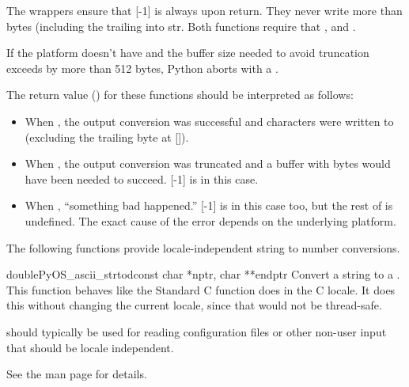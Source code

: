 The wrappers ensure that [-1] is always
 upon return. They never write more than
 bytes (including the trailing 
into str. Both functions require that ,
 and .

If the platform doesn't have  and the buffer
size needed to avoid truncation exceeds  by more than 512
bytes, Python aborts with a .

The return value () for these functions should be interpreted
as follows:

\begin{itemize}

\item When , the output conversion
  was successful and  characters were written to 
  (excluding the trailing  byte at
  []).

\item When , the output conversion was
  truncated and a buffer with  bytes would have
  been needed to succeed. [-1] is
   in this case.

\item When , ``something bad happened.''
  [-1] is  in this case
  too, but the rest of  is undefined. The exact cause of the
  error depends on the underlying platform.

\end{itemize}

The following functions provide locale-independent string to number
conversions.

\begin{cfuncdesc}{double}{PyOS_ascii_strtod}{const char *nptr, char **endptr}
Convert a string to a . This function behaves like the
Standard C function  does in the C locale. It does
this without changing the current locale, since that would not be
thread-safe.

 should typically be used for reading
configuration files or other non-user input that should be locale
independent. 

See the \UNIX{} man page  for details.

\end{cfuncdesc}

